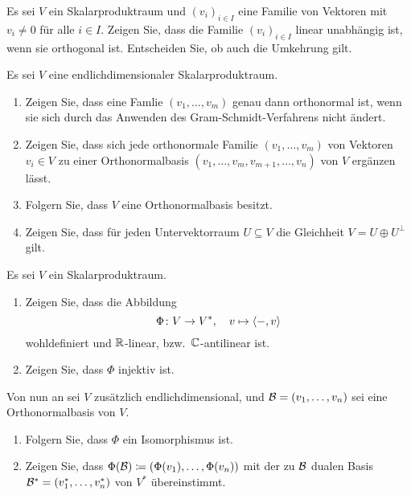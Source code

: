 \documentclass[a4paper, 10pt]{scrartcl}
\begin{document}
\begin{question}
  Es sei $V$ ein Skalarproduktraum und $(v_i)_{i \in I}$ eine Familie von Vektoren mit $v_i \neq 0$ für alle $i \in I$.
  Zeigen Sie, dass die Familie $(v_i)_{i \in I}$ linear unabhängig ist, wenn sie orthogonal ist.
  Entscheiden Sie, ob auch die Umkehrung gilt.
\end{question}


\begin{question}
  Es sei $V$ eine endlichdimensionaler Skalarproduktraum.
  \begin{enumerate}[leftmargin=*]
    \item
      Zeigen Sie, dass eine Famlie $(v_1, \dotsc, v_m)$ genau dann orthonormal ist, wenn sie sich durch das Anwenden des Gram-Schmidt-Verfahrens nicht ändert.
    \item
      Zeigen Sie, dass sich jede orthonormale Familie $(v_1, \dotsc, v_m)$ von Vektoren $v_i \in V$ zu einer Orthonormalbasis $(v_1, \dotsc, v_m, v_{m+1}, \dotsc, v_n)$ von $V$ ergänzen lässt.
    \item
      Folgern Sie, dass $V$ eine Orthonormalbasis besitzt.
    \item
      Zeigen Sie, dass für jeden Untervektorraum $U \subseteq V$ die Gleichheit $V = U \oplus U^\perp$ gilt.
  \end{enumerate}
\end{question}


\begin{question}
  Es sei $V$ ein Skalarproduktraum.
  \begin{enumerate}[leftmargin=*]
    \item
      Zeigen Sie, dass die Abbildung
      \[
        \Phi \colon V \to V^*,
        \quad
        v \mapsto \left\langle -, v \right\rangle
      \]
      wohldefiniert und $\mathbb{R}$-linear, bzw.\ $\mathbb{C}$-antilinear ist.
    \item
      Zeigen Sie, dass $\Phi$ injektiv ist.
  \end{enumerate}
  Von nun an sei $V$ zusätzlich endlichdimensional, und $\mathcal{B} = (v_1, \dotsc, v_n)$ sei eine Orthonormalbasis von $V$.
  \begin{enumerate}[leftmargin=*, resume]
    \item
      Folgern Sie, dass $\Phi$ ein Isomorphismus ist.
    \item
      Zeigen Sie, dass $\Phi(\mathcal{B}) \coloneqq (\Phi(v_1), \dotsc, \Phi(v_n))$ mit der zu $\mathcal{B}$ dualen Basis $\mathcal{B}^* = (v_1^*, \dotsc, v_n^*)$ von $V^*$ übereinstimmt.
  \end{enumerate}
\end{question}
\end{document}
